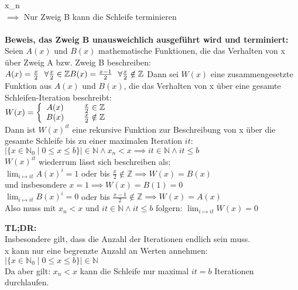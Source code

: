 \documentclass[a4paper]{article}
\begin{document}
\iff x_n  \\
\)
$\implies$ Nur Zweig B kann die Schleife terminieren \\
\\
\textbf{ Beweis, das Zweig B unausweichlich ausgeführt wird und terminiert: } \\
Seien $A(x)$ und $B(x)$ mathematische Funktionen, die das Verhalten von x über Zweig A bzw. Zweig B beschreiben: \\
\( 
A(x) = \frac{x}{2} ~~ \forall \frac{x}{2} \in \mathbb Z \\
B(x) = \frac{x-1}{2} ~~ \forall \frac{x}{2} \notin \mathbb Z \\
 \)
Dann sei $W(x)$ eine zusammengesetzte Funktion aus $A(x)$ und $B(x)$, die das Verhalten von x über eine gesamte Schleifen-Iteration beschreibt: \\
\(
W(x) = \left\{ \begin{array}{cc} 
                A(x) & \hspace{5mm} \frac{x}{2} \in \mathbb Z \\
                B(x) & \hspace{5mm} \frac{x}{2} \notin \mathbb Z \\
                \end{array} \right.
\) \\
Dann ist $W(x)^{it}$ eine rekursive Funktion zur Beschreibung von x über die gesamte Schleife bis zu einer maximalen Iteration $it$:\\
$\mid \{ x \in \mathbb N_0 \mid 0 \leq x \leq b \} \mid \in \mathbb N \land x_n < x \implies it \in \mathbb N \land it \leq b $ \\
$W(x)^{it}$ wiederrum lässt sich beschreiben als: \\
$ \lim_{i \mapsto it} A(x)^i = 1 $ oder bis $ \frac{x}{2} \notin \mathbb Z \implies W(x) = B(x) $ \\
und insbesondere $ x = 1 \implies W(x) = B(1) = 0 $\\
$ \lim_{i \mapsto it} B(x)^i = 0 $ oder bis $ \frac{x-1}{2} \notin \mathbb Z \implies W(x) = A(x) $ \\
Also muss mit  $x_n < x$ und $ it \in \mathbb N \land it \leq b $ folgern: $\lim_{i \mapsto it} W(x) = 0 $ \\

\pagebreak

\textbf{ TL;DR: }\\
Insbesondere gilt, dass die Anzahl der Iterationen endlich sein muss. \\
x kann nur eine begrenzte Anzahl an Werten annehmen: \\
$\mid \{ x \in \mathbb N_0 \mid 0 \leq x \leq b \} \mid \in \mathbb N$ \\
Da aber gilt: $x_n < x$ kann die Schleife nur maximal $it = b$ Iterationen durchlaufen. \\
\end{document}
